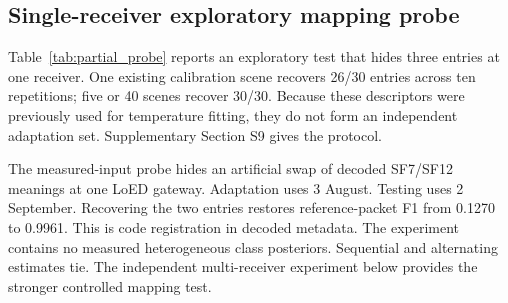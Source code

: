 \subsection{Single-receiver exploratory mapping probe}\label{sec:partial_probe}
Table~\ref{tab:partial_probe} reports an exploratory test that hides three entries at one receiver. One existing calibration scene recovers 26/30 entries across ten repetitions; five or 40 scenes recover 30/30. Because these descriptors were previously used for temperature fitting, they do not form an independent adaptation set. Supplementary Section S9 gives the protocol.

The measured-input probe hides an artificial swap of decoded SF7/SF12 meanings at one LoED gateway. Adaptation uses 3 August. Testing uses 2 September. Recovering the two entries restores reference-packet F1 from 0.1270 to 0.9961. This is code registration in decoded metadata. The experiment contains no measured heterogeneous class posteriors. Sequential and alternating estimates tie. The independent multi-receiver experiment below provides the stronger controlled mapping test.

